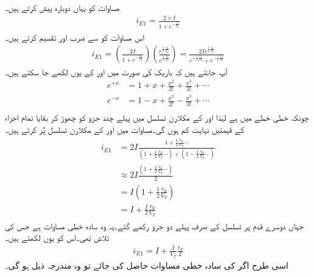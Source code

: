 مساوات   کو یہاں دوبارہ پیش کرتے ہیں۔
\begin{align}\label{مساوات_تفرقی_جوڑا_برقی_رو_کی_اصل_مساوات}
i_{E1}=\frac{2 \times I}{1+e^{-\frac{v_d}{V_T}}}
\end{align}
اس مساوات کو  سے ضرب اور تقسیم کرتے ہیں۔
\begin{align} \label{مساوات_تفرقی_پہلی_رو_بالمقابل_تفرقی_دباو_الف}
i_{E1}=\left( \frac{2 I}{1+e^{-\frac{v_d}{V_T}}}\right ) \left(\frac{e^{\frac{1}{2}\frac{v_d}{V_T}}}{e^{\frac{1}{2}\frac{v_d}{V_T}}} \right )=\frac{2I e^{\frac{1}{2}\frac{v_d}{V_T}}}{e^{+\frac{1}{2}\frac{v_d}{V_T}}+e^{-\frac{1}{2}\frac{v_d}{V_T}}}
\end{align}
آپ جانتے ہیں کہ باریک   کی صورت میں  اور  کے   یوں لکھے جا سکتے ہیں۔
\begin{align*}
e^{+x}&=1+x+\frac{x^2}{2!}+\frac{x^3}{3!}+\cdots\\
e^{-x}&=1-x+\frac{x^2}{2!}-\frac{x^3}{3!}+\cdots\\
\end{align*}
چونکہ خطی خطے میں  ہے لہٰذا    اور  کے مکلارن تسلسل میں پہلے چند جزو کو چھوڑ کر بقایا تمام اجزاء کے  قیمتیں نہایت کم ہوں گی۔مساوات   میں   اور   کے  مکلارن تسلسل پُر کرتے ہیں۔
\begin{gather}
\begin{aligned}
i_{E1}&=2I \frac{1+\frac{1}{2}\frac{v_d}{V_T} \cdots}{\left( 1+\frac{1}{2}\frac{v_d}{V_T} \cdots\right )+\left(1-\frac{1}{2}\frac{v_d}{V_T}\cdots \right )}\\
& \approx 2I \frac{\left(1+\frac{1}{2}\frac{v_d}{V_T} \cdots \right )}{2}\\
& = I \left(1+\frac{1}{2} \frac{v_d}{V_T} \right )\\
&=I+\frac{I}{2}\frac{v_d}{V_T}
\end{aligned}
\end{gather}
جہاں دوسرے قدم پر تسلسل کے صرف پہلے دو جزو رکھے گئے۔یہ وہ سادہ خطی مساوات ہے جس کی تلاش تھی۔اس کو یوں لکھتے ہیں۔
\begin{align}
i_{E1}=I+\frac{I}{V_T}\frac{v_d}{2}
\end{align}
اسی طرح اگر  کی سادہ خطی مساوات حاصل کی جائے تو وہ مندرجہ ذیل ہو گی۔
